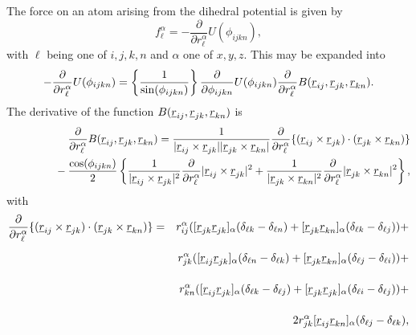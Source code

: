 The force on an atom arising from the dihedral potential is given by
\begin{equation}
f_{\ell}^{\alpha}=-\frac{\partial}{\partial
r_{\ell}^{\alpha}}U(\phi_{ijkn}),
\end{equation}
with $\ell$ being one of $i,j,k,n$ and $\alpha$ one of $x,y,z$. This
may
be expanded into
\begin{equation}
-\frac{\partial}{\partial r_{\ell}^{\alpha}}U(\phi_{ijkn})=
\left\{\frac{1}{\sin(\phi_{ijkn})}\right\}
\frac{\partial}{\partial \phi_{ijkn}}U(\phi_{ijkn})
\frac{\partial}{\partial r_{\ell}^{\alpha}}
B(\mbox{$\underline{r}$}_{ij},\mbox{$\underline{r}$}_{jk},\mbox{$\underline{r}$}_{kn}).
\end{equation}
The derivative of the function
$B(\mbox{$\underline{r}$}_{ij},\mbox{$\underline{r}$}_{jk},\mbox{$\underline{r}$}_{kn})$ is
\begin{eqnarray}
& &\frac{\partial}{\partial r_{\ell}^{\alpha}}
B(\mbox{$\underline{r}$}_{ij},\mbox{$\underline{r}$}_{jk},\mbox{$\underline{r}$}_{kn})=
\frac{1}{|\mbox{$\underline{r}$}_{ij}\times\mbox{$\underline{r}$}_{jk}||\mbox{$\underline{r}$}_{jk}\times\mbox{$\underline{r}$}_{kn}|}
\frac{\partial}{\partial r_{\ell}^{\alpha}} 
\{(\mbox{$\underline{r}$}_{ij}\times\mbox{$\underline{r}$}_{jk})\cdot(\mbox{$\underline{r}$}_{jk}\times\mbox{$\underline{r}$}_{kn})\}
\\
& & \phantom{xxxxxx}
 -\frac{\cos(\phi_{ijkn})}{2}\left\{
\frac{1}{|\mbox{$\underline{r}$}_{ij}\times\mbox{$\underline{r}$}_{jk}|^{2}}
\frac{\partial}{\partial r_{\ell}^{\alpha}}
|\mbox{$\underline{r}$}_{ij}\times\mbox{$\underline{r}$}_{jk}|^{2}+
\frac{1}{|\mbox{$\underline{r}$}_{jk}\times\mbox{$\underline{r}$}_{kn}|^{2}}
\frac{\partial}{\partial r_{\ell}^{\alpha}}
|\mbox{$\underline{r}$}_{jk}\times\mbox{$\underline{r}$}_{kn}|^{2}
\right \},\nonumber
\end{eqnarray}
with
\begin{eqnarray}
\frac{\partial}{\partial r_{\ell}^{\alpha}}
\{(\vek{r}_{ij}\times\vek{r}_{jk})\cdot(\vek{r}_{jk}\times\vek{r}_{kn})\}&=&
r_{ij}^{\alpha}([\vek{r}_{jk}\vek{r}_{jk}]_{\alpha}(\delta_{\ell
k}-\delta_{\ell n})+ [\vek{r}_{jk}\vek{r}_{kn}]_{\alpha}(\delta_{\ell
k}-\delta_{\ell j}))+
\nonumber \\ \phantom{\frac{\partial}{\partial r_{\ell}^{\alpha}}}& & 
r_{jk}^{\alpha}([\vek{r}_{ij}\vek{r}_{jk}]_{\alpha}(\delta_{\ell
n}-\delta_{\ell k})+ [\vek{r}_{jk}\vek{r}_{kn}]_{\alpha}(\delta_{\ell
j}-\delta_{\ell i}))+
\nonumber \\ \phantom{\frac{\partial}{\partial r_{\ell}^{\alpha}}} & &
r_{kn}^{\alpha}([\vek{r}_{ij}\vek{r}_{jk}]_{\alpha}(\delta_{\ell
k}-\delta_{\ell j})+ [\vek{r}_{jk}\vek{r}_{jk}]_{\alpha}(\delta_{\ell
i}-\delta_{\ell j}))+
\nonumber \\ \phantom{\frac{\partial}{\partial r_{\ell}^{\alpha}}} & &
2r_{jk}^{\alpha}[\vek{r}_{ij}\vek{r}_{kn}]_{\alpha}(\delta_{\ell
j}-\delta_{\ell k}),
\end{eqnarray}
